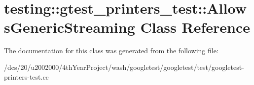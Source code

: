\hypertarget{classtesting_1_1gtest__printers__test_1_1AllowsGenericStreaming}{}\section{testing\+:\+:gtest\+\_\+printers\+\_\+test\+:\+:Allows\+Generic\+Streaming Class Reference}
\label{classtesting_1_1gtest__printers__test_1_1AllowsGenericStreaming}


The documentation for this class was generated from the following file\+:\begin{DoxyCompactItemize}
\item 
/dcs/20/u2002000/4th\+Year\+Project/wash/googletest/googletest/test/googletest-\/printers-\/test.\+cc\end{DoxyCompactItemize}
